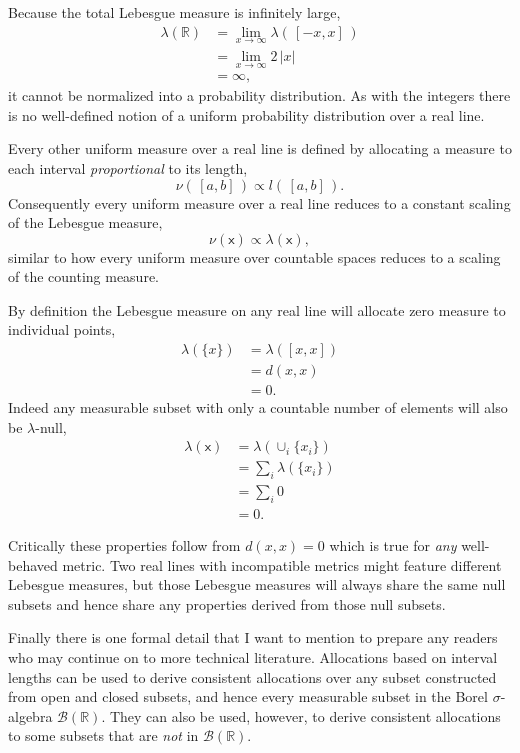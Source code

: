 \documentclass[
  letterpaper,
  DIV=11,
  numbers=noendperiod]{scrartcl}
\begin{document}
Because the total Lebesgue measure is infinitely large, \begin{align*}
\lambda(\mathbb{R})
&=
\lim_{x \rightarrow \infty} \lambda( \, [-x, x] \, )
\\
&=
\lim_{x \rightarrow \infty} 2 \, | x |
\\
&=
\infty,
\end{align*} it cannot be normalized into a probability distribution. As
with the integers there is no well-defined notion of a uniform
probability distribution over a real line.

Every other uniform measure over a real line is defined by allocating a
measure to each interval \emph{proportional} to its length, \[
\nu( \, [a, b] \, ) \propto l( \, [a, b] \, ).
\] Consequently every uniform measure over a real line reduces to a
constant scaling of the Lebesgue measure, \[
\nu ( \mathsf{x} ) \propto \lambda ( \mathsf{x} ),
\] similar to how every uniform measure over countable spaces reduces to
a scaling of the counting measure.

By definition the Lebesgue measure on any real line will allocate zero
measure to individual points, \begin{align*}
\lambda(\{ x \})
&= \lambda([x, x])
\\
&= d(x, x)
\\
&= 0.
\end{align*} Indeed any measurable subset with only a countable number
of elements will also be \(\lambda\)-null, \begin{align*}
\lambda(\mathsf{x})
&=
\lambda(\cup_{i} \{ x_{i} \} )
\\
&=
\sum_{i} \lambda( \{ x_{i} \} )
\\
&=
\sum_{i} 0
\\
&=
0.
\end{align*}

Critically these properties follow from \(d(x, x) = 0\) which is true
for \emph{any} well-behaved metric. Two real lines with incompatible
metrics might feature different Lebesgue measures, but those Lebesgue
measures will always share the same null subsets and hence share any
properties derived from those null subsets.

Finally there is one formal detail that I want to mention to prepare any
readers who may continue on to more technical literature. Allocations
based on interval lengths can be used to derive consistent allocations
over any subset constructed from open and closed subsets, and hence
every measurable subset in the Borel \(\sigma\)-algebra
\(\mathcal{B}(\mathbb{R})\). They can also be used, however, to derive
consistent allocations to some subsets that are \emph{not} in
\(\mathcal{B}(\mathbb{R})\).
\end{document}
